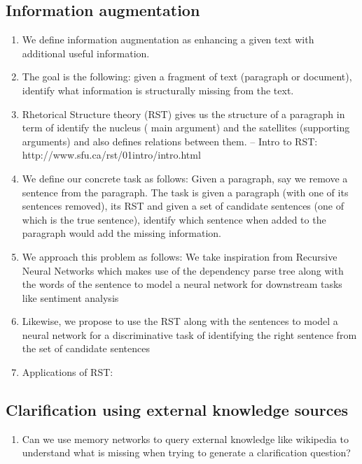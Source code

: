 \documentclass[11pt]{article}
\begin{document}
\subsection{Information augmentation}
\begin{enumerate}
\item We define information augmentation as enhancing a given text with additional useful information. 
\item The goal is the following: given a fragment of text (paragraph or document), identify what information is structurally missing from the text. 
\item Rhetorical Structure theory (RST) gives us the structure of a paragraph in term of identify the nucleus ( main argument) and the satellites (supporting arguments) and also defines relations between them. -- Intro to RST: http://www.sfu.ca/rst/01intro/intro.html
\item We define our concrete task as follows: Given a paragraph, say we remove a sentence from the paragraph. The task is given a paragraph (with one of its sentences removed), its RST and given a set of candidate sentences (one of which is the true sentence), identify which sentence when added to the paragraph would add the missing information.
\item We approach this problem as follows: We take inspiration from Recursive Neural Networks which makes use of the dependency parse tree along with the words of the sentence to model a neural network for downstream tasks like sentiment analysis
\item Likewise, we propose to use the RST along with the sentences to model a neural network for a discriminative task of identifying the right sentence from the set of candidate sentences
\item Applications of RST: %
\end{enumerate}

\subsection{Clarification using external knowledge sources}
\begin{enumerate}
	\item Can we use memory networks to query external knowledge like wikipedia to understand what is missing when trying to generate a clarification question? %
\end{enumerate}
\end{document}
